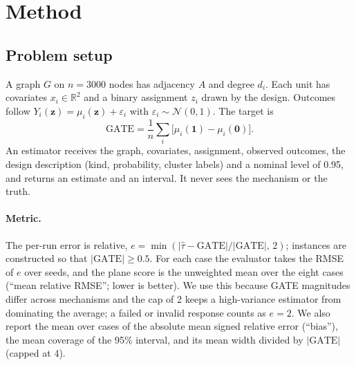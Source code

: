 \documentclass{article}
\newcommand{\gate}{\mathrm{GATE}}
\begin{document}
\section{Method}
\subsection{Problem setup}
A graph $G$ on $n=3000$ nodes has adjacency $A$ and degree $d_i$. Each unit has covariates $x_i\in\mathbb{R}^2$ and a binary assignment $z_i$ drawn by the design. Outcomes follow $Y_i(\mathbf z)=\mu_i(\mathbf z)+\varepsilon_i$ with $\varepsilon_i\sim\mathcal N(0,1)$. The target is
\begin{equation}
\gate=\frac1n\sum_{i}\big[\mu_i(\mathbf 1)-\mu_i(\mathbf 0)\big].
\end{equation}
An estimator receives the graph, covariates, assignment, observed outcomes, the design description (kind, probability, cluster labels) and a nominal level of 0.95, and returns an estimate and an interval. It never sees the mechanism or the truth.

\paragraph{Metric.} The per-run error is relative, $e=\min(|\hat\tau-\gate|/|\gate|,\,2)$; instances are constructed so that $|\gate|\ge 0.5$. For each case the evaluator takes the RMSE of $e$ over seeds, and the plane score is the unweighted mean over the eight cases (``mean relative RMSE''; lower is better). We use this because GATE magnitudes differ across mechanisms and the cap of 2 keeps a high-variance estimator from dominating the average; a failed or invalid response counts as $e=2$. We also report the mean over cases of the absolute mean signed relative error (``bias''), the mean coverage of the 95\% interval, and its mean width divided by $|\gate|$ (capped at 4).
\end{document}
